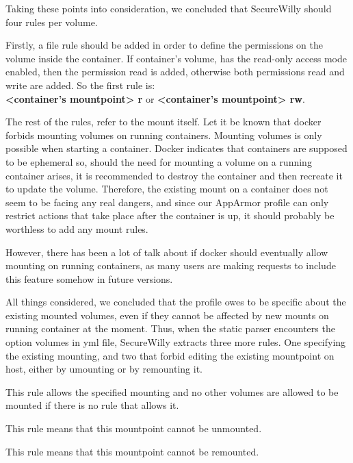 Taking these points into consideration, we concluded that  SecureWilly should four rules per volume.

Firstly, a file rule should be added in order to define the permissions on the volume inside the container. If container's volume, has the read-only access mode enabled, then the permission read is added, otherwise both permissions read and write are added. So the first rule is: \\\textbf{\textless container's mountpoint\textgreater{} r} or \textbf{\textless container's mountpoint\textgreater{} rw}.

The rest of the rules, refer to the mount itself. Let it be known that docker forbids mounting volumes on running containers. Mounting volumes is only possible when starting a container. Docker indicates that containers are supposed to be ephemeral so, should the need for mounting a volume on a running container arises,  it is recommended to destroy the container and then recreate it to update the volume. Therefore, the existing mount on a container does not seem to be facing any real dangers, and since our AppArmor profile can only restrict actions that take place after the container is up, it should probably be worthless to add any mount rules.

However,  there has been a lot of talk about if docker should eventually allow mounting on running containers, as many users are making requests to include this feature somehow in future versions.

All things considered, we concluded that the profile owes to be specific about the existing mounted volumes, even if they cannot be affected by new mounts on running container at the moment. Thus, when the static parser encounters the option volumes in yml file, SecureWilly extracts three more rules. One specifying the existing mounting, and two that forbid editing the existing mountpoint on host, either by umounting or by remounting it.
\begin{description}[style=nextline]
\item[mount \textless source host path\textgreater{} -\textgreater{} \textless container's mountpoint\textgreater{}]
This rule allows the specified mounting and no other volumes are allowed to be mounted if there is no rule that allows it.

\item[deny umount \textless container's mountpoint\textgreater{}]
This rule means that this mountpoint cannot be unmounted.

\item[deny remount \textless container's mountpoint\textgreater{}]
This rule means that this mountpoint cannot be remounted.
\end{description}

